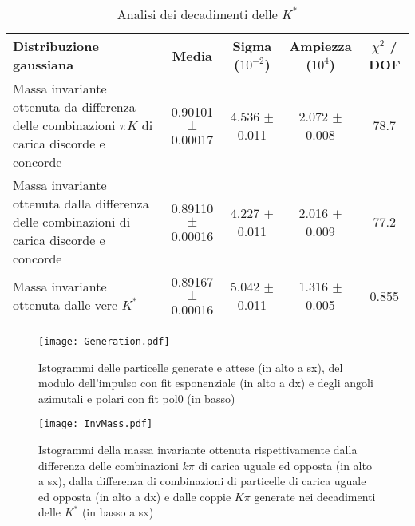\documentclass[a4paper,10pt,twocolumn]{article}
\begin{document}
\begin{table*}
  \caption{Analisi dei decadimenti delle $K^*$}
  \label{tab:fit}
  \centering
  \begin{tabular}{p{5cm}cccc}
    \toprule
    Distribuzione gaussiana                                                                          & Media                 & Sigma ($10^{-2}$) & Ampiezza ($10^4$) & $\chi^2$ / DOF \\
    \midrule
    Massa invariante ottenuta da differenza delle combinazioni $\pi K$ di carica discorde e concorde & 0.90101 $\pm$ 0.00017 & 4.536 $\pm$ 0.011 & 2.072 $\pm$ 0.008 & 78.7           \\
    \midrule
    Massa invariante ottenuta dalla differenza delle combinazioni di carica discorde e concorde      & 0.89110 $\pm$ 0.00016 & 4.227 $\pm$ 0.011 & 2.016 $\pm$ 0.009 & 77.2           \\
    \midrule
    Massa invariante ottenuta dalle vere $K^*$                                                       & 0.89167 $\pm$ 0.00016 & 5.042 $\pm$ 0.011 & 1.316 $\pm$ 0.005 & 0.855          \\
    \bottomrule
  \end{tabular}
\end{table*}

\begin{figure*}
  \texttt{[image: Generation.pdf]}
  \caption{Istogrammi delle particelle generate e attese (in alto a sx), del modulo dell'impulso con fit esponenziale (in alto a dx) e degli angoli azimutali e polari con fit pol0 (in basso)}
  \label{fig:Generation}
\end{figure*}

\begin{figure*}
  \texttt{[image: InvMass.pdf]}
  \caption{Istogrammi della massa invariante ottenuta rispettivamente dalla differenza delle combinazioni $k\pi$ di carica uguale ed opposta (in alto a sx), dalla differenza di combinazioni di particelle di carica uguale ed opposta (in alto a dx) e dalle coppie $K\pi$ generate nei decadimenti delle $K^*$ (in basso a sx)}
  \label{fig:InvMass}
\end{figure*}
\end{document}
